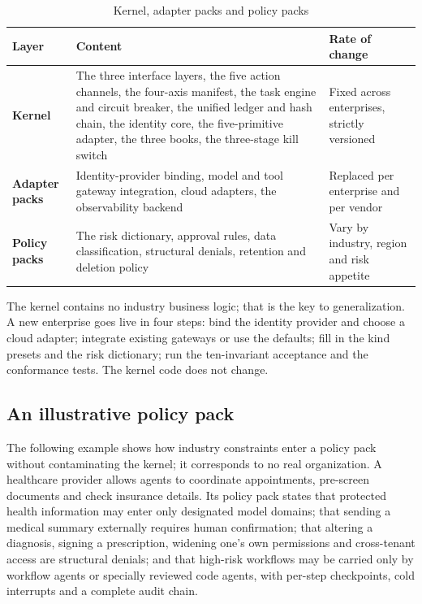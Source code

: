 \begin{table}[htbp]
\centering
\caption{Kernel, adapter packs and policy packs}
\label{tab:kernel}
\begin{tabularx}{\textwidth}{@{}>{\bfseries}L{2.6cm}L{6.6cm}Y@{}}
  \toprule
  \textbf{Layer} & \textbf{Content} & \textbf{Rate of change}\\
  \midrule
  Kernel & The three interface layers, the five action channels, the four-axis manifest, the task engine and circuit breaker, the unified ledger and hash chain, the identity core, the five-primitive adapter, the three books, the three-stage kill switch & Fixed across enterprises, strictly versioned\\
  Adapter packs & Identity-provider binding, model and tool gateway integration, cloud adapters, the observability backend & Replaced per enterprise and per vendor\\
  Policy packs & The risk dictionary, approval rules, data classification, structural denials, retention and deletion policy & Vary by industry, region and risk appetite\\
  \bottomrule
\end{tabularx}
\end{table}

The kernel contains no industry business logic; that is the key to generalization. A new enterprise goes live in four steps: bind the identity provider and choose a cloud adapter; integrate existing gateways or use the defaults; fill in the kind presets and the risk dictionary; run the ten-invariant acceptance and the conformance tests. The kernel code does not change.

\subsection{An illustrative policy pack}

The following example shows how industry constraints enter a policy pack without contaminating the kernel; it corresponds to no real organization. A healthcare provider allows agents to coordinate appointments, pre-screen documents and check insurance details. Its policy pack states that protected health information may enter only designated model domains; that sending a medical summary externally requires human confirmation; that altering a diagnosis, signing a prescription, widening one's own permissions and cross-tenant access are structural denials; and that high-risk workflows may be carried only by workflow agents or specially reviewed code agents, with per-step checkpoints, cold interrupts and a complete audit chain.

